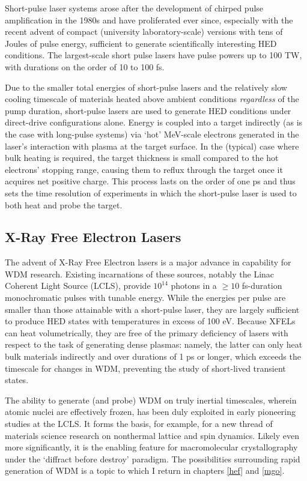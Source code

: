 \documentclass [11pt, proquest, article] {uwthesis}[2016/11/22]
\begin{document}
Short-pulse laser systems arose after the development of chirped pulse amplification in the 1980s and have proliferated ever since, especially with the recent advent of compact (university laboratory-scale) versions with tens of Joules of pulse energy, sufficient to generate scientifically interesting HED conditions. \cite{maine1988generation, boehly1997initial} The largest-scale short pulse lasers have pulse powers up to 100 TW, with durations on the order of 10 to 100 fs.

Due to the smaller total energies of short-pulse lasers and the relatively slow cooling timescale of materials heated above ambient conditions \textit{regardless} of the pump duration, short-pulse lasers are used to generate HED conditions under direct-drive configurations alone. Energy is coupled into a target indirectly (as is the case with long-pulse systems) via `hot' MeV-scale electrons generated in the laser's interaction with plasma at the target surface. In the (typical) case where bulk heating is required, the target thickness is small compared to the hot electrons' stopping range, causing them to reflux through the target once it acquires net positive charge. This process lasts on the order of one ps and thus sets the time resolution of experiments in which the short-pulse laser is used to both heat and probe the target. \cite{nilson2010scaling}

\label{foobar}
\subsection{X-Ray Free Electron Lasers}
The advent of X-Ray Free Electron lasers is a major advance in capability for WDM research. Existing incarnations of these sources, notably the Linac Coherent Light Source (LCLS), provide $10^{14}$ photons in a $\geq 10$ fs-duration monochromatic pulses with tunable energy. While the energies per pulse are smaller than those attainable with a short-pulse laser, they are largely sufficient to produce HED states with temperatures in excess of 100 eV. \cite{vinko2012creation} Because XFELs can heat volumetrically, they are free of the primary deficiency of lasers with respect to the task of generating dense plasmas: namely, the latter can only heat bulk materials indirectly and over durations of 1 ps or longer, which exceeds the timescale for changes in WDM, preventing the study of short-lived transient states.

The ability to generate (and probe) WDM on truly inertial timescales, wherein atomic nuclei are effectively frozen, has been duly exploited in early pioneering studies at the LCLS. It forms the basis, for example, for a new thread of materials science research on nonthermal lattice and spin dynamics. \cite{lee2012non, lee2003finite}  Likely even more significantly, it is the enabling feature for macromolecular crystallography under the `diffract before destroy' paradigm. The possibilities surrounding rapid generation of WDM is a topic to which I return in chapters \ref{hef} and \ref{mgo}. \cite{vinko2012creation}
\end{document}
